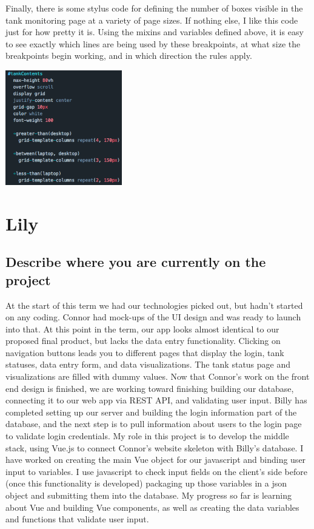 \documentclass[draftclsnofoot,onecolumn,letterpaper,10pt,compsoc]{IEEEtran}
\begin{document}
\lstset{language=Stylus}


Finally, there is some stylus code for defining the number of boxes visible in the tank monitoring page at a variety of page sizes.
If nothing else, I like this code just for how pretty it is.
Using the mixins and variables defined above, it is easy to see exactly which lines are being used by these breakpoints, at what size the breakpoints begin working, and in which direction the rules apply.

\centerline{\includegraphics[height=5cm]{screenshots/stylus.png}}

\section{Lily} 
\subsection{Describe where you are currently on the project}
At the start of this term we had our technologies picked out, but hadn’t started on any coding. Connor had mock-ups of the UI design and was ready to launch into that. At this point in the term, our app looks almost identical to our proposed final product, but lacks the data entry functionality. Clicking on navigation buttons leads you to different pages that display the login, tank statuses, data entry form, and data visualizations. The tank status page and visualizations are filled with dummy values. Now that Connor’s work on the front end design is finished, we are working toward finishing building our database, connecting it to our web app via REST API, and validating user input. Billy has completed setting up our server and building the login information part of the database, and the next step is to pull information about users to the login page to validate login credentials. My role in this project is to develop the middle stack, using Vue.js to connect Connor’s website skeleton with Billy’s database. I have worked on creating the main Vue object for our javascript and binding user input to variables. I use javascript to check input fields on the client’s side before (once this functionality is developed) packaging up those variables in a json object and submitting them into the database. My progress so far is learning about Vue and building Vue components, as well as creating the data variables and functions that validate user input.
\end{document}
